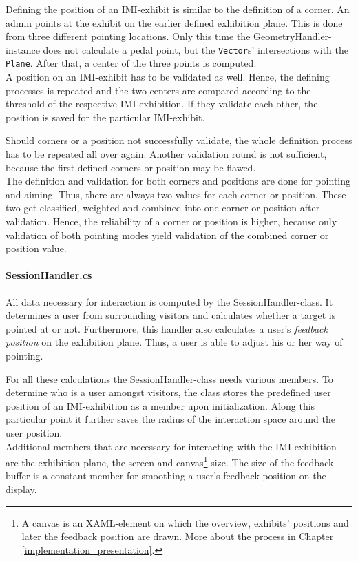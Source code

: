 Defining the position of an \ac{IMI}-exhibit is similar to the definition of a corner. An admin points at the exhibit on the earlier defined exhibition plane. This is done from three different pointing locations. Only this time the GeometryHandler-instance does not calculate a pedal point, but the \texttt{Vector}s' intersections with the \texttt{Plane}. After that, a center of the three points is computed.
\\
A position on an \ac{IMI}-exhibit has to be validated as well. Hence, the defining processes is repeated and the two centers are compared according to the threshold of the respective \ac{IMI}-exhibition. If they validate each other, the position is saved for the particular \ac{IMI}-exhibit. 

Should corners or a position not successfully validate, the whole definition process has to be repeated all over again. Another validation round is not sufficient, because the first defined corners or position may be flawed.
\\
The definition and validation for both corners and positions are done for pointing and aiming. Thus, there are always two values for each corner or position. These two get classified, weighted and combined into one corner or position after validation. Hence, the reliability of a corner or position is higher, because only validation of both pointing modes yield validation of the combined corner or position value.


\paragraph{SessionHandler.cs} All data necessary for interaction is computed by the SessionHandler-class. It determines a user from surrounding visitors and calculates whether a target is pointed at or not. Furthermore, this handler also calculates a user's \textit{feedback position} on the exhibition plane. Thus, a user is able to adjust his or her way of pointing.

For all these calculations the SessionHandler-class needs various members. To determine who is a user amongst visitors, the class stores the predefined user position of an \ac{IMI}-exhibition as a member upon initialization. Along this particular point it further saves the radius of the interaction space around the user position.
\\
Additional members that are necessary for interacting with the \ac{IMI}-exhibition are the exhibition plane, the screen and canvas\footnote{A canvas is an XAML-element on which the overview, exhibits' positions and later the feedback position are drawn. More about the process in Chapter \ref{implementation_presentation}.} size. The size of the feedback buffer is a constant member for smoothing a user's feedback position on the display. 

